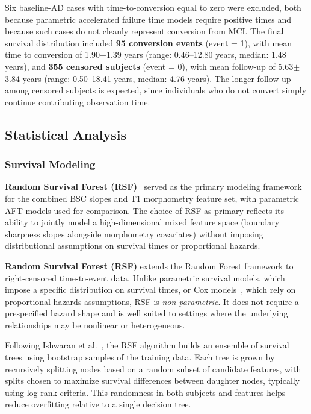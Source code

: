 \documentclass[blue]{ludusofficial}
\begin{document}
Six baseline-AD cases with time-to-conversion equal to zero were excluded, both because parametric accelerated failure time models require positive times and because such cases do not cleanly represent conversion from MCI. The final survival distribution included \textbf{95 conversion events} (event = 1), with mean time to conversion of 1.90$\pm$1.39 years (range: 0.46--12.80 years, median: 1.48 years), and \textbf{355 censored subjects} (event = 0), with mean follow-up of 5.63$\pm$3.84 years (range: 0.50--18.41 years, median: 4.76 years). The longer follow-up among censored subjects is expected, since individuals who do not convert simply continue contributing observation time.

\subsection{Statistical Analysis}

\subsubsection{Survival Modeling}

\textbf{Random Survival Forest (RSF)}~\cite{ishwaran2008rsf} served as the primary modeling framework for the combined BSC slopes and T1 morphometry feature set, with parametric AFT models used for comparison. The choice of RSF as primary reflects its ability to jointly model a high-dimensional mixed feature space (boundary sharpness slopes alongside morphometry covariates) without imposing distributional assumptions on survival times or proportional hazards.

\textbf{Random Survival Forest (RSF)} extends the Random Forest framework to right-censored time-to-event data. Unlike parametric survival models, which impose a specific distribution on survival times, or Cox models~\cite{cox1972}, which rely on proportional hazards assumptions, RSF is \textit{non-parametric}. It does not require a prespecified hazard shape and is well suited to settings where the underlying relationships may be nonlinear or heterogeneous.

Following Ishwaran et al.~\cite{ishwaran2008rsf}, the RSF algorithm builds an ensemble of survival trees using bootstrap samples of the training data. Each tree is grown by recursively splitting nodes based on a random subset of candidate features, with splits chosen to maximize survival differences between daughter nodes, typically using log-rank criteria. This randomness in both subjects and features helps reduce overfitting relative to a single decision tree.
\end{document}
